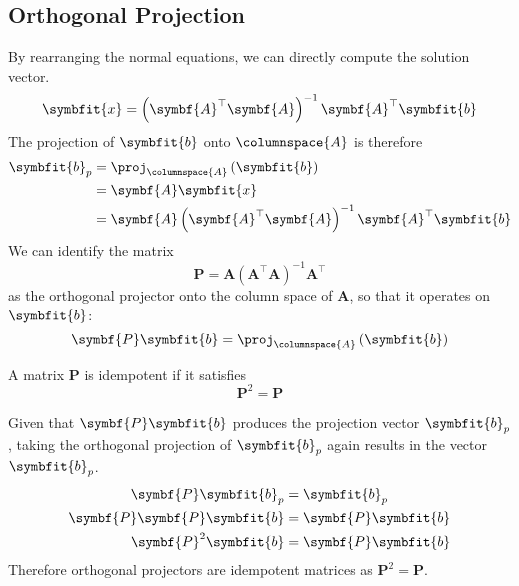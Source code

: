 \documentclass{article}
\begin{document}
\subsection{Orthogonal Projection}
By rearranging the normal equations, we can directly compute the solution vector.
\begin{equation*}
    \symbfit{x} = \left( \symbf{A}^\top \symbf{A} \right)^{-1} \symbf{A}^\top \symbfit{b}
\end{equation*}
The projection of \(\symbfit{b}\) onto \(\columnspace{A}\) is therefore
\begin{align*}
    \symbfit{b}_p & = \proj_{\columnspace{A}} \left( \symbfit{b} \right) \\
                  & = \symbf{A} \symbfit{x}                            \\
                  & = \symbf{A} \left( \symbf{A}^\top \symbf{A} \right)^{-1} \symbf{A}^\top \symbfit{b} 
\end{align*}
We can identify the matrix
\begin{equation*}
    \symbf{P} = \symbf{A} \left( \symbf{A}^\top \symbf{A} \right)^{-1} \symbf{A}^\top
\end{equation*}
as the orthogonal projector onto the column space of \(\symbf{A}\), so that it operates on \(\symbfit{b}\):
\begin{equation*}
    \symbf{P} \symbfit{b} = \proj_{\columnspace{A}} \left( \symbfit{b} \right)
\end{equation*}
\begin{definition}[Idempotent]
    A matrix \(\symbf{P}\) is idempotent if it satisfies
    \begin{equation*}
        \symbf{P}^2 = \symbf{P}
    \end{equation*}
\end{definition}
\begin{theorem}
    Given that \(\symbf{P}\symbfit{b}\) produces the projection vector \(\symbfit{b}_p\),
    taking the orthogonal projection of \(\symbfit{b}_p\) again results in the vector \(\symbfit{b}_p\).
    \begin{align*}
        \symbf{P} \symbfit{b}_p        & = \symbfit{b}_p \\
        \symbf{P}\symbf{P} \symbfit{b} & = \symbf{P} \symbfit{b} \\
        \symbf{P}^2 \symbfit{b} & = \symbf{P} \symbfit{b}
    \end{align*}
    Therefore orthogonal projectors are idempotent matrices as \(\symbf{P}^2 = \symbf{P}\).
\end{theorem}
\end{document}
